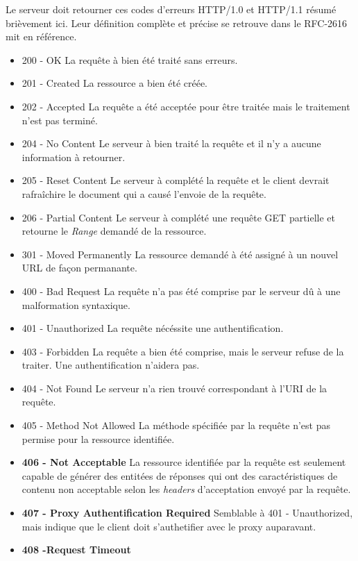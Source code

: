 \documentclass{scrreprt}
\begin{document}
Le serveur doit retourner ces codes d'erreurs HTTP/1.0 et HTTP/1.1 résumé brièvement ici. Leur définition complète et précise se retrouve dans le RFC-2616 mit en référence. \\
 \begin{itemize}
 \item 200 - OK
 \subitem La requête à bien été traité sans erreurs.
 \item 201 - Created
 \subitem La ressource a bien été créée.
 \item 202 - Accepted
 \subitem La requête a été acceptée pour être traitée mais le traitement n'est pas terminé.
 \item 204 - No Content
 \subitem Le serveur à bien traité la requête et il n'y a aucune information à retourner.
 \item 205 - Reset Content
 \subitem Le serveur à complété la requête et le client devrait rafraîchire le document qui a causé l'envoie de la requête.
 \item 206 - Partial Content
 \subitem Le serveur à complété une requête GET partielle et retourne le \textit{Range} demandé de la ressource.
 \item 301 - Moved Permanently
 \subitem La ressource demandé à été assigné à un nouvel URL de façon permanante.
 \item 400 - Bad Request
 \subitem La requête n'a pas été comprise par le serveur dû à une malformation syntaxique. 
 \item 401 - Unauthorized
 \subitem La requête nécéssite une authentification.
 \item 403 - Forbidden
 \subitem La requête a bien été comprise, mais le serveur refuse de la traiter. Une authentification n'aidera pas.
 \item 404 - Not Found
 \subitem Le serveur n'a rien trouvé correspondant à l'URI de la requête.
 \item 405 - Method Not Allowed
 \subitem La méthode spécifiée par la requête n'est pas permise pour la ressource identifiée.
 \item \textbf{406 - Not Acceptable}
 \subitem La ressource identifiée par la requête est seulement capable de générer des entitées de réponses qui ont des caractéristiques de contenu non acceptable selon les \textit{headers} d'acceptation envoyé par la requête.
 \item \textbf{407 - Proxy Authentification Required}
 \subitem Semblable à 401 - Unauthorized, mais indique que le client doit s'authetifier avec le proxy auparavant.
 \item \textbf{408 -Request Timeout}

\end{itemize}
\end{document}
